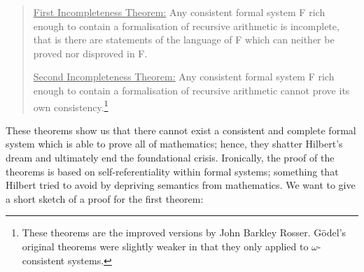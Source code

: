 \documentclass{article}
\begin{document}
\begin{quote}
\underline{First Incompleteness Theorem:} Any consistent formal system F rich enough to contain a formalisation of recursive arithmetic is incomplete, that is there are statements of the language of F which can neither be proved nor disproved in F.

\underline{Second Incompleteness Theorem:} Any consistent formal system F rich enough to contain a formalisation of recursive arithmetic cannot prove its own consistency.\footnote{These theorems are the improved versions by John Barkley Rosser. Gödel's original theorems were slightly weaker in that they only applied to $\omega$-consistent systems.\cite[pp.~293--320]{fraenkel}}
\end{quote}
These theorems show us that there cannot exist a consistent and complete formal system which is able to prove all of mathematics; hence, they shatter Hilbert's dream and ultimately end the foundational crisis. Ironically, the proof of the theorems is based on self-referentiality within formal systems; something that Hilbert tried to avoid by depriving semantics from mathematics.
We want to give a short sketch of a proof for the first theorem:
\end{document}
